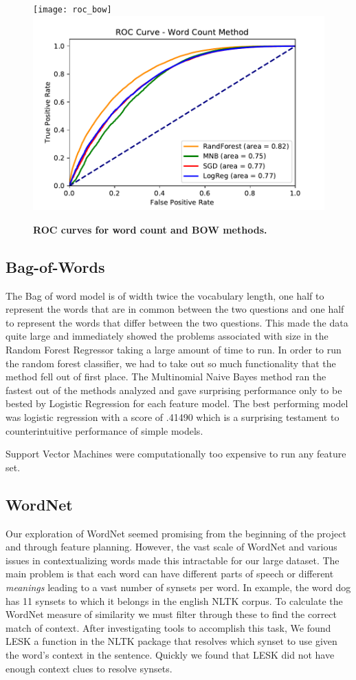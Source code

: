 \documentclass{article} %
\begin{document}
	\begin{figure}[]
		\centering
		\texttt{[image: roc\_bow]}
		\includegraphics[width=.49\textwidth]{roc_wc}
		\caption{\textbf{ROC curves for word count and BOW methods.}}
		\label{fig:roc_wc}
	\end{figure}
	
	\subsection{Bag-of-Words} \label{sub:bow_res}
	
	The Bag of word model is of width twice the vocabulary length, one half to represent the words that are in common between the two questions and one half to represent the words that differ between the two questions. This made the data quite large and immediately showed the problems associated with size in the Random Forest Regressor taking a large amount of time to run. In order to run the random forest classifier, we had to take out so much functionality that the method fell out of first place. The Multinomial Naive Bayes method ran the fastest out of the methods analyzed and gave surprising performance only to be bested by Logistic Regression for each feature model. The best performing model was logistic regression with a score of .41490 which is a surprising testament to counterintuitive performance of simple models.
	
	Support Vector Machines were computationally too expensive to run any feature set.
	
	\subsection{WordNet} \label{sub:wnet_res}
	Our exploration of WordNet seemed promising from the beginning of the project and through feature planning. However, the vast scale of WordNet and various issues in contextualizing words made this intractable for our large dataset. The main problem is that each word can have different parts of speech or different \textit{meanings} leading to a vast number of synsets per word. In example, the word dog has 11 synsets to which it belongs in the english NLTK corpus. To calculate the WordNet measure of similarity we must filter through these to find the correct match of context. After investigating tools to accomplish this task, We found LESK a function in the NLTK package that resolves which synset to use given the word's context in the sentence. Quickly we found that LESK did not have enough context clues to resolve synsets.
	
\end{document}
